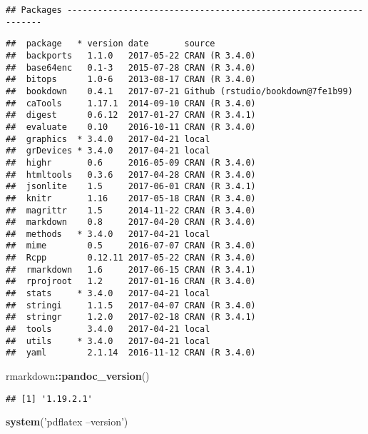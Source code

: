 \documentclass[]{article}
\newenvironment{Shaded}{\begin{snugshade}}{\end{snugshade}}
\newcommand{\KeywordTok}[1]{\textcolor[rgb]{0.13,0.29,0.53}{\textbf{#1}}}
\newcommand{\StringTok}[1]{\textcolor[rgb]{0.31,0.60,0.02}{#1}}
\newcommand{\OperatorTok}[1]{\textcolor[rgb]{0.81,0.36,0.00}{\textbf{#1}}}
\newcommand{\NormalTok}[1]{#1}
\begin{document}
\begin{verbatim}
## Packages -----------------------------------------------------------------
\end{verbatim}

\begin{verbatim}
##  package   * version date       source                           
##  backports   1.1.0   2017-05-22 CRAN (R 3.4.0)                   
##  base64enc   0.1-3   2015-07-28 CRAN (R 3.4.0)                   
##  bitops      1.0-6   2013-08-17 CRAN (R 3.4.0)                   
##  bookdown    0.4.1   2017-07-21 Github (rstudio/bookdown@7fe1b99)
##  caTools     1.17.1  2014-09-10 CRAN (R 3.4.0)                   
##  digest      0.6.12  2017-01-27 CRAN (R 3.4.1)                   
##  evaluate    0.10    2016-10-11 CRAN (R 3.4.0)                   
##  graphics  * 3.4.0   2017-04-21 local                            
##  grDevices * 3.4.0   2017-04-21 local                            
##  highr       0.6     2016-05-09 CRAN (R 3.4.0)                   
##  htmltools   0.3.6   2017-04-28 CRAN (R 3.4.0)                   
##  jsonlite    1.5     2017-06-01 CRAN (R 3.4.1)                   
##  knitr       1.16    2017-05-18 CRAN (R 3.4.0)                   
##  magrittr    1.5     2014-11-22 CRAN (R 3.4.0)                   
##  markdown    0.8     2017-04-20 CRAN (R 3.4.0)                   
##  methods   * 3.4.0   2017-04-21 local                            
##  mime        0.5     2016-07-07 CRAN (R 3.4.0)                   
##  Rcpp        0.12.11 2017-05-22 CRAN (R 3.4.0)                   
##  rmarkdown   1.6     2017-06-15 CRAN (R 3.4.1)                   
##  rprojroot   1.2     2017-01-16 CRAN (R 3.4.0)                   
##  stats     * 3.4.0   2017-04-21 local                            
##  stringi     1.1.5   2017-04-07 CRAN (R 3.4.0)                   
##  stringr     1.2.0   2017-02-18 CRAN (R 3.4.1)                   
##  tools       3.4.0   2017-04-21 local                            
##  utils     * 3.4.0   2017-04-21 local                            
##  yaml        2.1.14  2016-11-12 CRAN (R 3.4.0)
\end{verbatim}

\begin{Shaded}
\begin{Highlighting}[]
\NormalTok{rmarkdown}\OperatorTok{::}\KeywordTok{pandoc_version}\NormalTok{()}
\end{Highlighting}
\end{Shaded}

\begin{verbatim}
## [1] '1.19.2.1'
\end{verbatim}

\begin{Shaded}
\begin{Highlighting}[]
\KeywordTok{system}\NormalTok{(}\StringTok{'pdflatex --version'}\NormalTok{)}
\end{Highlighting}
\end{Shaded}
\end{document}

